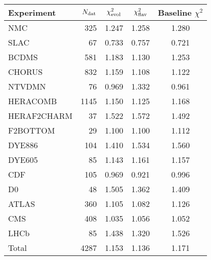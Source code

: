 \begin{center}
    \renewcommand*{\arraystretch}{1.50}
    \small
  \begin{tabularx}{\textwidth}{Xrccc}
  \toprule
  Experiment    & $N_{\rm dat}$ & $\chi^2_{\rm evol}$ & $\chi^2_{\rm flav}$    & Baseline $\chi^2$     \\
  \midrule
  NMC   & 325 & 1.247 & 1.258  & 1.280     \\
  SLAC  & 67  & 0.733 & 0.757  & 0.721    \\
  BCDMS & 581 & 1.183 & 1.130  & 1.253 \\
  CHORUS & 832 & 1.159 & 1.108  & 1.122 \\
  NTVDMN & 76   & 0.969 & 1.332 & 0.961 \\
  HERACOMB & 1145 & 1.150 & 1.125 & 1.168 \\
  HERAF2CHARM & 37 & 1.522 & 1.572 & 1.492 \\
  F2BOTTOM & 29 & 1.100 & 1.100 & 1.112 \\ 
  DYE886 & 104 & 1.410 & 1.534 & 1.560 \\
  DYE605 & 85 & 1.143 & 1.161 & 1.157 \\ 
  CDF & 105 & 0.969 & 0.921 & 0.996 \\
  D0 & 48 & 1.505 & 1.362 & 1.409 \\
  ATLAS & 360 & 1.105 & 1.082 & 1.126 \\
  CMS & 408 & 1.035 & 1.056 & 1.052 \\
  LHCb & 85 & 1.438 & 1.320 & 1.526 \\
  \bottomrule
  Total & 4287 & 1.153 & 1.136 & 1.171 \\
  \bottomrule
  \end{tabularx}
  \end{center}
  